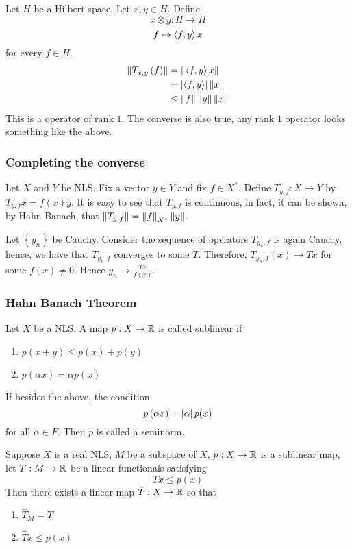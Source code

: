Let $H$ be a Hilbert space. Let $x,y \in H$. Define
\begin{equation*}
    x \otimes y : H \to H
\end{equation*}
\begin{equation*}
    f \mapsto \left\langle f,y \right\rangle x 
\end{equation*}
for every $f\in H$.
\begin{align*}
    \left\lVert T_{x,y} \left( f \right) \right\rVert &= \left\lVert \left\langle f,y \right\rangle x \right\rVert \\
    &= \left\lvert \left\langle f,y \right\rangle \right\rvert\left\lVert x \right\rVert \\
&\le \left\lVert f \right\rVert \left\lVert y \right\rVert \left\lVert x \right\rVert
\end{align*}
This is a operator of rank $1$. The converse is also true, any rank $1$ operator looks something like the above.

\subsubsection{Completing the converse}

Let $X$ and $Y$ be NLS. Fix a vector $y \in Y$ and fix $f\in X^{*}$. Define $T_{y,f} : X \to Y$ by $T_{y,f} x = f(x)y$. It is easy to see that $T_{y,f}$ is continuous, in fact, it can be shown, by Hahn Banach, that $\left\lVert T_{y,f} \right\rVert =\left\lVert f \right\rVert_{X^{*}} \left\lVert y \right\rVert$.

Let $\left\{ y_{n} \right\}$ be Cauchy. Consider the sequence of operators $T_{y_{n}, f}$ is again Cauchy, hence, we have that $T_{y_{n},f}$ converges to some $T$. Therefore, $T_{y_{n}, f} (x) \to Tx$ for some $f(x) \ne 0$. Hence $y_{n} \to \frac{Tx}{f\left( x \right)}$.

\subsubsection{Hahn Banach Theorem}

Let $X$ be a NLS. A map $p : X \to \mathbb R$ is called sublinear if
\begin{enumerate}
    \item $p\left( x+y \right) \le p\left( x \right) + p \left( y \right)$
    \item $p\left( \alpha x \right) = \alpha p\left( x \right)$
\end{enumerate}
If besides the above, the condition
\begin{equation*}
    p\left( \alpha x \right) = \left\lvert \alpha \right\rvert p(x)
\end{equation*}
for all $\alpha\in F$. Then $p$ is called a seminorm.

\begin{theorem}
    Suppose $X$ is a real NLS, $M$ be a subspace of $X$, $p : X \to \mathbb R$ is a sublinear map, let $T: M \to \mathbb R$ be a linear functionals satisfying 
    \begin{equation*}
	Tx \le p(x)
    \end{equation*}
    Then there exists a linear map $\hat{T} : X \to \mathbb R$ so that
\begin{enumerate}
    \item $\hat{T}_{M} = T$
    \item $\hat{T} x \le p(x)$
\end{enumerate}
\label{thm:HBT-real}
\end{theorem}
